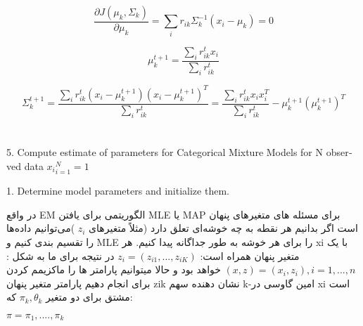 \begin{equation}
\frac{\partial J(\mu_k,\Sigma_k)}{\partial \mu_k} = \sum_{i} r_{ik} \Sigma_k^{-1} (x_i - \mu_k) = 0
\end{equation}

\begin{equation}
\mu_k^{t+1} = \frac{\sum_{i} r_{ik}^t x_i}{\sum_{i} r_{ik}^t}
\end{equation}

\begin{equation}
\Sigma_k^{t+1} = \frac{\sum_{i} r_{ik}^t (x_i - \mu_k^{t+1}) (x_i - \mu_k^{t+1})^T}{\sum_{i} r_{ik}^t} = \frac{\sum_{i} r_{ik}^t x_i x_i^T}{\sum_{i} r_{ik}^t} - \mu_k^{t+1} ({\mu_k^{t+1}})^T
\end{equation}
\newpage
\huge
\raggedright \section{}
\large
\begin{latin}
5. Compute estimate of parameters for Categorical Mixture Models for N observed data ${{x_i}}_{i=1}^{N} = 1$

1. Determine model parameters and initialize them.

\end{latin}
\raggedleft
در واقع EM الگوریتمی برای یافتن MLE یا MAP برای مسئله های متغیرهای پنهان است اگر بدانیم هر نقطه به چه خوشه‌ای تعلق دارد (مثلاً متغیرهای $ {z_i} $ )می‌توانیم داده‌ها را تقسیم بندی کنیم و MLE را برای هر خوشه به طور جداگانه پیدا کنیم. هر xi با یک متغیر پنهان همراه است:
$z_i = (z_{i1}, . . . , z_{iK} )$
در نتیجه  برای ما به شکل :
$ (x , z) = (x_i , z_i ), i = 1, . . . , n $
خواهد بود و حالا میتوانیم پارامتر ها را ماکزیمم کردن  برای  انجام دهیم 
پارامتر متغیر پنهان zik  نشان دهنده سهم k-امین گاوسی در xi است مشتق   برای دو متغیر 
$  \pi_k , \theta_k  $
که:

\raggedright $ \pi = \pi_1,....,\pi_k $

